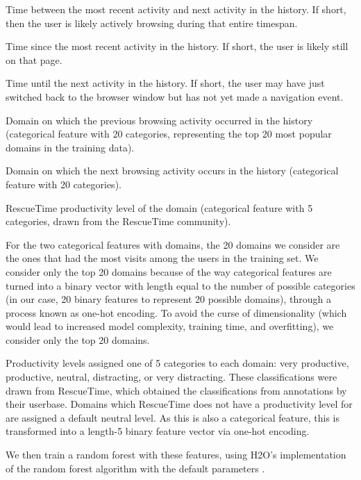 \documentclass{sigchi}
\begin{document}
\begin{compactitem}
    \item Time between the most recent activity and next activity in the history. If short, then the user is likely actively browsing during that entire timespan.
    \item Time since the most recent activity in the history. If short, the user is likely still on that page.
    \item Time until the next activity in the history. If short, the user may have just switched back to the browser window but has not yet made a navigation event.
    \item Domain on which the previous browsing activity occurred in the history (categorical feature with 20 categories, representing the top 20 most popular domains in the training data).
    \item Domain on which the next browsing activity occurs in the history (categorical feature with 20 categories).
    \item RescueTime productivity level of the domain (categorical feature with 5 categories, drawn from the RescueTime community).
\end{compactitem}

For the two categorical features with domains, the 20 domains we consider are the ones that had the most visits among the users in the training set. We consider only the top 20 domains because of the way categorical features are turned into a binary vector with length equal to the number of possible categories (in our case, 20 binary features to represent 20 possible domains), through a process known as one-hot encoding. To avoid the curse of dimensionality (which would lead to increased model complexity, training time, and overfitting), we consider only the top 20 domains.

Productivity levels assigned one of 5 categories to each domain: very productive, productive, neutral, distracting, or very distracting. These classifications were drawn from RescueTime, which obtained the classifications from annotations by their userbase. Domains which RescueTime does not have a productivity level for are assigned a default neutral level. As this is also a categorical feature, this is transformed into a length-5 binary feature vector via one-hot encoding.

We then train a random forest with these features, using H2O's implementation of the random forest algorithm with the default parameters \cite{randomforest}.
\end{document}
